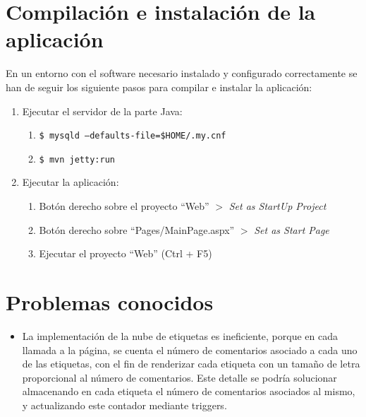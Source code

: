\documentclass[a4paper,twoside]{article}
\begin{document}
\section{Compilación e instalación de la aplicación}

En un entorno con el software necesario instalado y configurado correctamente se han de seguir los siguiente pasos para compilar e instalar la aplicación:

\begin{enumerate}

\item Ejecutar el servidor de la parte Java:

\begin{enumerate}
\item {\tt \$ mysqld --defaults-file=\$HOME/.my.cnf}
\item {\tt \$ mvn jetty:run}
\end{enumerate}

\item Ejecutar la aplicación:

\begin{enumerate}
\item Botón derecho sobre el proyecto ``Web'' $>$ {\it Set as StartUp Project}
\item Botón derecho sobre ``Pages/MainPage.aspx'' $>$ {\it Set as Start Page}
\item Ejecutar el proyecto ``Web'' (Ctrl + F5)
\end{enumerate}

\end{enumerate}


\section{Problemas conocidos}

\begin{itemize}
\item La implementación de la nube de etiquetas es ineficiente, porque en cada llamada a la página, se cuenta el número de comentarios asociado a cada uno de las etiquetas, con el fin de renderizar cada etiqueta con un tamaño de letra proporcional al número de comentarios. Este detalle se podría solucionar almacenando en cada etiqueta el número de comentarios asociados al mismo, y actualizando este contador mediante triggers.
\end{itemize}
\end{document}
